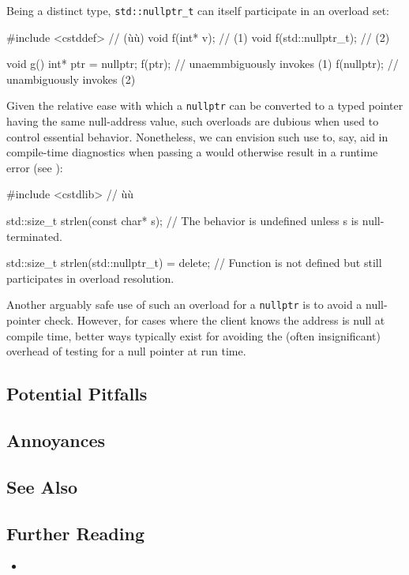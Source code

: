 Being a distinct type, \lstinline!std::nullptr_t! can itself participate
in an overload set:

\begin{emcppslisting}
#include  <cstddef> // (ù{}ù)
void f(int* v);          // (1)
void f(std::nullptr_t);  // (2)

void g()
{
    int* ptr = nullptr;
    f(ptr);      // unaemmbiguously invokes (1)
    f(nullptr);  // unambiguously invokes (2)
}
\end{emcppslisting}


\noindent Given the relative ease with which a \lstinline!nullptr! can be
converted to a typed pointer having the same null-address value, such
overloads are dubious when used to control essential behavior.
Nonetheless, we can envision such use to, say, aid in compile-time
diagnostics when passing a  would otherwise result in
a runtime error (see
):

\begin{emcppshiddenlisting}[emcppsbatch=e4]
#include <cstdlib>  // ù{}ù
\end{emcppshiddenlisting}
\begin{emcppslisting}[emcppsbatch=e4]
std::size_t strlen(const char* s);
    // The behavior is undefined unless s is null-terminated.

std::size_t strlen(std::nullptr_t) = delete;
    // Function is not defined but still participates in overload resolution.
\end{emcppslisting}


\noindent Another arguably safe use of such an overload for a \lstinline!nullptr! is
to avoid a null-pointer check. However, for cases where the client knows the address is null at compile time, better ways typically exist for avoiding the (often
insignificant) overhead of testing for a null pointer at run time.

\subsection[Potential Pitfalls]{Potential Pitfalls}\label{potential-pitfalls}

\hspace*{\fill}

\subsection[Annoyances]{Annoyances}\label{annoyances}

\hspace*{\fill}

\subsection[See Also]{See Also}\label{see-also}

\hspace*{\fill}

\subsection[Further Reading]{Further Reading}\label{further-reading}

\begin{itemize}
\item{\cite{meyers15a}}
\end{itemize}

